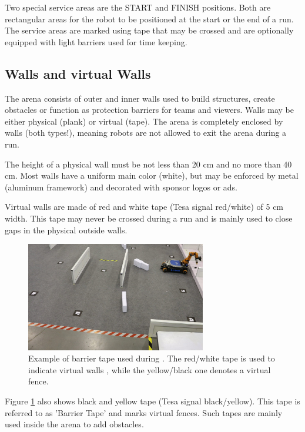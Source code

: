 Two special service areas are the START and FINISH positions. Both are rectangular areas for the robot to be positioned at the start or the end of a run. The service areas are marked using tape that may be crossed and are optionally equipped with light barriers used for time keeping.


\subsection{Walls and virtual Walls}
\label{subsec: Walls and virtual Walls}

The arena consists of outer and inner walls used to build structures, create obstacles or function as protection barriers for teams and viewers. Walls may be either physical (plank) or virtual (tape).
The arena is completely enclosed by walls (both types!), meaning robots are not allowed to exit the arena during a run.

The height of a physical wall must be not less than 20 cm and no more than 40 cm.
Most walls have a uniform main color (white), but may be enforced by metal (aluminum framework) and decorated with sponsor logos or ads.

Virtual walls are made of red and white tape (Tesa signal red/white) of 5 cm width. This tape may never be crossed during a run and is mainly used to close gaps in the physical outside walls.

\begin{figure} [h!]
\centering
\includegraphics[width= 0.7\textwidth ]{./images/general_rules/barrier_tapes_in_china15.jpg}
\caption{Example of barrier tape used during . The red/white tape is used to indicate virtual walls , while the yellow/black one denotes a virtual fence.}
\label{fig:walls_and_virt_walls}
\end{figure}

Figure \ref{fig:walls_and_virt_walls} also shows black and yellow tape (Tesa signal black/yellow). 
This tape is referred to as 'Barrier Tape' and marks virtual fences. 
Such tapes are mainly used inside the arena to add obstacles.


